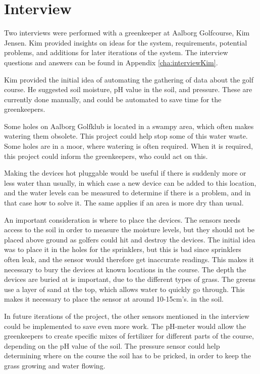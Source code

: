 \section{Interview}
Two interviews were performed with a greenkeeper at Aalborg Golfcourse, Kim Jensen. Kim provided insights on ideas for the system, requirements, potential problems, and additions for later iterations of the system. The interview questions and answers can be found in Appendix \ref{cha:interviewKim}. 

Kim provided the initial idea of automating the gathering of data about the golf course. He suggested soil moisture, pH value in the soil, and pressure. These are currently done manually, and could be automated to save time for the greenkeepers.

Some holes on Aalborg Golfklub is located in a swampy area, which often makes watering them obsolete. This project could help stop some of this water waste. Some holes are in a moor, where watering is often required. When it is required, this project could inform the greenkeepers, who could act on this.

Making the devices hot pluggable would be useful if there is suddenly more or less water than usually, in which case a new device can be added to this location, and the water levels can be measured to determine if there is a problem, and in that case how to solve it. The same applies if an area is more dry than usual.

An important consideration is where to place the devices. The sensors needs access to the soil in order to measure the moisture levels, but they should not be placed above ground as golfers could hit and destroy the devices. The initial idea was to place it in the holes for the sprinklers, but this is bad since sprinklers often leak, and the sensor would therefore get inaccurate readings.
This makes it necessary to bury the devices at known locations in the course. The depth the devices are buried at is important, due to the different types of grass. The greens use a layer of sand at the top, which allows water to quickly go through. This makes it necessary to place the sensor at around 10-15cm's. in the soil.

In future iterations of the project, the other sensors mentioned in the interview could be implemented to save even more work. The pH-meter would allow the greenkeepers to create specific mixes of fertilizer for different parts of the course, depending on the pH value of the soil. The pressure sensor could help determining where on the course the soil has to be pricked, in order to keep the grass growing and water flowing.